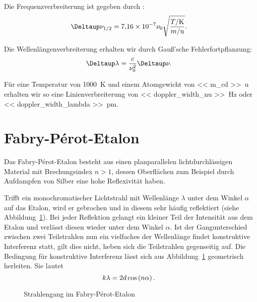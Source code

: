 Die Frequenzverbreiterung ist gegeben durch
\parencite{chemgapedia/spektrallinien/dopplerverbreiterung}:
\[
    \Deltaup \nu_{1/2} = \num{7.16e-7} \nu_0
    \sqrt{\frac{T / \si\kelvin}{m / \si\atomicmassunit}}.
\]

Die Wellenlängenverbreiterung erhalten wir durch Gauß'sche
Fehlerfortpflanzung:
\[
    \Deltaup \lambda = \frac{c}{\nu_0^2} \Deltaup \nu.
\]

Für eine Temperatur von \SI{1000}{\kelvin} und einem Atomgewicht von \SI{<<
m_cd >>}{\atomicmassunit} \parencite[Umschlag]{meschede-gerthsen_24} erhalten
wir so eine Linienverbreiterung von \SI{<< doppler_width_nu >>}{\hertz} oder
\SI{<< doppler_width_lambda >>}{\pico\meter}.

\section{Fabry-Pérot-Etalon}

Das Fabry-Pérot-Etalon besteht aus einen planparallelen lichtdurchlässigen
Material mit Brechungsindex $n>1$, dessen Oberflächen zum Beispiel durch
Aufdampfen von Silber eine hohe Reflexivität haben.

Trifft ein monochromatischer Lichtstrahl mit Wellenlänge $\lambda$ unter dem
Winkel $\alpha$ auf das Etalon, wird er gebrochen und in diesem sehr häufig
reflektiert (siehe Abbildung~\ref{fig:Etalon}). Bei jeder Reflektion gelangt
ein kleiner Teil der Intensität aus dem Etalon und verlässt diesen wieder unter
dem Winkel $\alpha$. Ist der Gangunterschied zwischen zwei Teilstrahlen nun ein
vielfaches der Wellenlänge findet konstruktive Interferenz statt, gilt dies
nicht, heben sich die Teilstrahlen gegenseitig auf. Die Bedingung für
konstruktive Interferenz lässt sich aus Abbildung~\ref{fig:Etalon} geometrisch
herleiten. Sie lautet
\[
    k\lambda = 2d\cos\del{n\alpha}.
\]
\begin{figure}
    \centering
    \caption{%
        Strahlengang im Fabry-Pérot-Etalon
    }
    \label{fig:Etalon}
\end{figure}

